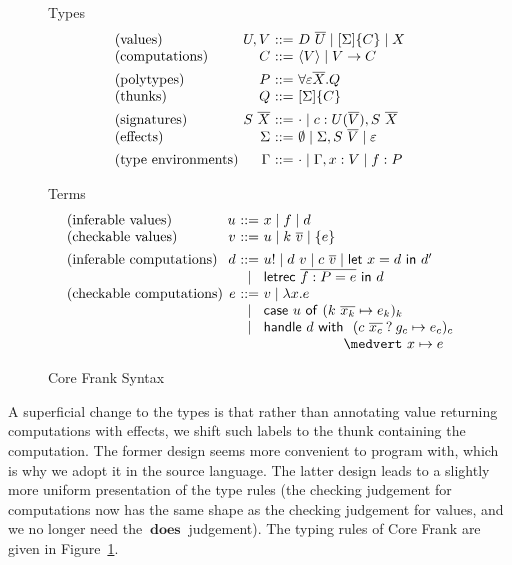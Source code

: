 \documentclass[preprint]{sigplanconf}
\makeatletter
\newcommand{\many}{\overline}
\newcommand\ba{\begin{array}}
\newcommand\ea{\end{array}}
\newcommand{\bstack}{\begin{array}[t]{@{}l@{}}}
\newcommand{\estack}{\end{array}}
\newenvironment{syntax}{\[\ba{@{}l@{~}r@{~}c@{~}l@{}}}{\ea\]}
\newcommand{\judgeword}[1]{~\mathbf{#1}~}
\newcommand{\rt}[1]{\langle{#1}\rangle}   %
\newcommand{\sig}{S}
\newcommand{\sigs}{\Sigma}
\newcommand{\effbox}[1]{[#1]}
\newcommand{\key}[1]{\mathsf{#1}}
\newcommand{\handleSymbol}{\mathbin{?}}
\newcommand{\handle}[2]{{#1} \handleSymbol {#2}}
\newcommand{\thunk}[1]{\{{#1}\}}
\newcommand{\force}[1]{{#1}!}
\newcommand\slab[1]{(\textrm{#1})}
\makeatother
\begin{document}
\begin{figure}
Types
\begin{syntax}
\slab{values}       &U, V   &::=& D~\many{U} \mid  \effbox{\sigs}\thunk{C} \mid X \\
\slab{computations} &C      &::=& \rt{V} \mid V \to C
\\[1ex]
\slab{polytypes}    &P      &::=& \forall \varepsilon \many{X}.Q \\
\slab{thunks}       &Q      &::=& \effbox{\sigs}\thunk{C}
\\[1ex]
\slab{signatures}   &\sig~\many{X} &::=& \cdot \mid c : U(\many{V}), \sig~\many{X} \\
\slab{effects}      &\sigs  &::=&
  \emptyset \mid \sigs, \sig~\many{V} \mid \varepsilon
\\[1ex]
\slab{type environments}     &\Gamma &::=& \cdot \mid \Gamma, x:V \mid f:P \\
\end{syntax}

Terms
\begin{syntax}
\slab{inferable values}       &u  &::= & x \mid f \mid d                           \\
\slab{checkable values}       &v  &::= & u \mid k~\many{v} \mid \thunk{e}
\\[1ex]
\slab{inferable computations} &d  &::= & \force{u} \mid d~v \mid c~\many{v}
                                   \mid  \key{let}~x=d~\key{in}~d' \\
                              &   &\mid& \key{letrec}~\many{f : P = e}~\key{in}~d \\
\slab{checkable computations} &e  &::= & v \mid \lambda x.e \\
  &&\mid& \key{case}~u~\key{of}~
            (k~\many{x_k} \mapsto e_k)_k \\
  &&\mid& \key{handle} ~d~ \key{with}
            \bstack
            ~~(\handle{c~\many{x_c}}{g_c} \mapsto e_c)_c \\
            \medvert~ x        \mapsto e \\
            \estack \\
\end{syntax}
\caption{Core Frank Syntax}
\label{fig:core-syntax}
\end{figure}


A superficial change to the types is that rather than annotating value
returning computations with effects, we shift such labels to the thunk
containing the computation. The former design seems more convenient to
program with, which is why we adopt it in the source language. The
latter design leads to a slightly more uniform presentation of the
type rules (the checking judgement for computations now has the same
shape as the checking judgement for values, and we no longer need the
$\judgeword{does}$ judgement).
%
The typing rules of Core Frank are given in
Figure~\ref{fig:core-syntax}.
\end{document}
